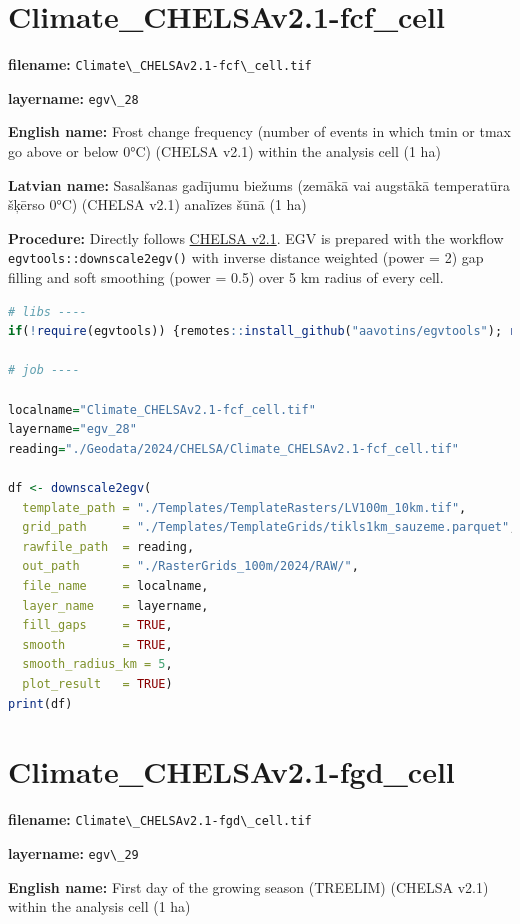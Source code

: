 \documentclass[
]{book}
\newcommand{\passthrough}[1]{#1}
\begin{document}
\section{Climate\_CHELSAv2.1-fcf\_cell}\label{ch06.028}

\textbf{filename:} \passthrough{\lstinline!Climate\_CHELSAv2.1-fcf\_cell.tif!}

\textbf{layername:} \passthrough{\lstinline!egv\_28!}

\textbf{English name:} Frost change frequency (number of events in which tmin or tmax go above or below 0°C) (CHELSA v2.1) within the analysis cell (1 ha)

\textbf{Latvian name:} Sasalšanas gadījumu biežums (zemākā vai augstākā temperatūra šķērso 0°C) (CHELSA v2.1) analīzes šūnā (1 ha)

\textbf{Procedure:} Directly follows \hyperref[Ch04.11]{CHELSA v2.1}. EGV is prepared with the
workflow \passthrough{\lstinline!egvtools::downscale2egv()!} with inverse distance weighted (power = 2)
gap filling and soft smoothing (power = 0.5) over 5 km radius of every cell.

\begin{lstlisting}[language=R]
# libs ----
if(!require(egvtools)) {remotes::install_github("aavotins/egvtools"); require(egvtools)}

# job ----

localname="Climate_CHELSAv2.1-fcf_cell.tif"
layername="egv_28"
reading="./Geodata/2024/CHELSA/Climate_CHELSAv2.1-fcf_cell.tif"

df <- downscale2egv(
  template_path = "./Templates/TemplateRasters/LV100m_10km.tif",
  grid_path     = "./Templates/TemplateGrids/tikls1km_sauzeme.parquet",
  rawfile_path  = reading,
  out_path      = "./RasterGrids_100m/2024/RAW/",
  file_name     = localname,
  layer_name    = layername,
  fill_gaps     = TRUE,
  smooth        = TRUE,
  smooth_radius_km = 5,
  plot_result   = TRUE)
print(df)
\end{lstlisting}

\section{Climate\_CHELSAv2.1-fgd\_cell}\label{ch06.029}

\textbf{filename:} \passthrough{\lstinline!Climate\_CHELSAv2.1-fgd\_cell.tif!}

\textbf{layername:} \passthrough{\lstinline!egv\_29!}

\textbf{English name:} First day of the growing season (TREELIM) (CHELSA v2.1) within the analysis cell (1 ha)
\end{document}

